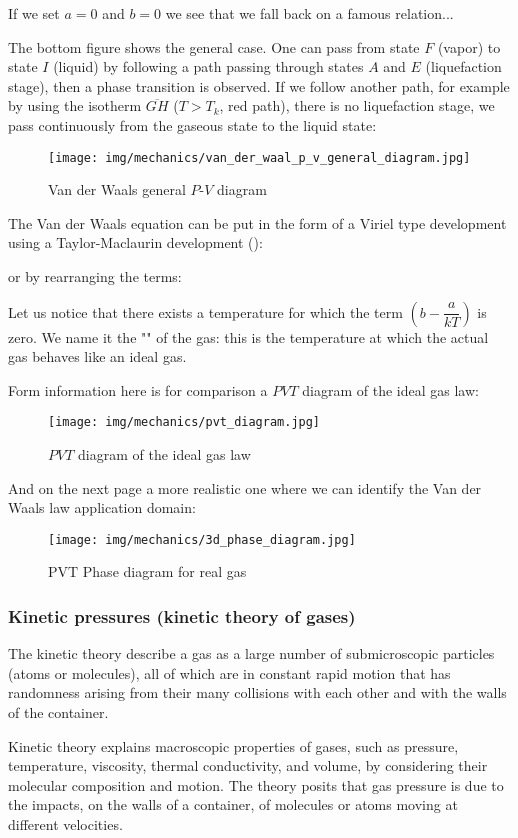 	If we set $a = 0$ and $b = 0$ we see that we fall back on a famous relation...

	The bottom figure shows the general case. One can pass from state $F$ (vapor) to state $I$ (liquid) by following a path passing through states $A$ and $E$ (liquefaction stage), then a phase transition is observed. If we follow another path, for example by using the isotherm $\overline{GH}$ ($T> T_k$, red path), there is no liquefaction stage, we pass continuously from the gaseous state to the liquid state:	
	\begin{figure}[H]
		\centering
		\texttt{[image: img/mechanics/van\_der\_waal\_p\_v\_general\_diagram.jpg]}
		\caption{Van der Waals general $P$-$V$ diagram}
	\end{figure}
	The Van der Waals equation can be put in the form of a Viriel type development using a Taylor-Maclaurin development ():
	
	or by rearranging the terms:
	
	Let us notice that there exists a temperature for which the term $\left(b-\dfrac{a}{kT}\right)$ is zero. We name it the "" of the gas: this is the temperature at which the actual gas behaves like an ideal gas.
	
	Form information here is for comparison a $PVT$ diagram of the ideal gas law:
	\begin{figure}[H]
		\centering
		\texttt{[image: img/mechanics/pvt\_diagram.jpg]}
		\caption{$PVT$ diagram of the ideal gas law}
	\end{figure}
	And on the next page a more realistic one where we can identify the Van der Waals law application domain:
	\begin{figure}[H]
		\centering
		\texttt{[image: img/mechanics/3d\_phase\_diagram.jpg]}
		\caption{PVT Phase diagram for real gas}
	\end{figure}
	
	\pagebreak
	\subsubsection{Kinetic pressures (kinetic theory of gases)}
	The kinetic theory describe a gas as a large number of submicroscopic particles (atoms or molecules), all of which are in constant rapid motion that has randomness arising from their many collisions with each other and with the walls of the container.
	
	Kinetic theory explains macroscopic properties of gases, such as pressure, temperature, viscosity, thermal conductivity, and volume, by considering their molecular composition and motion. The theory posits that gas pressure is due to the impacts, on the walls of a container, of molecules or atoms moving at different velocities.
	
